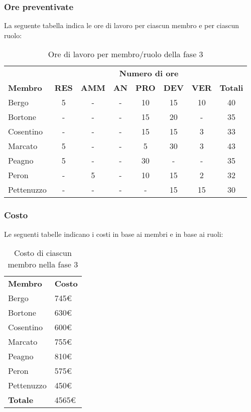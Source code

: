 	\subsubsection{Ore preventivate}
		La seguente tabella indica le ore di lavoro per ciascun membro e per ciascun ruolo:
		\begin{table}[h]
			\centering
			\begin{tabular}{| l | c c c c c c | c |}
				\rowcolor{LightBlue}
				& \multicolumn{7}{c}{\textbf{\color{white}Numero di ore}}	\\
	
				\rowcolor{LightBlue}
				\textbf{\color{white}Membro}
				& \textbf{\color{white}RES}
				& \textbf{\color{white}AMM}
				& \textbf{\color{white}AN}
				& \textbf{\color{white}PRO}
				& \textbf{\color{white}DEV}
				& \textbf{\color{white}VER}
				& \textbf{\color{white}Totali}\\
	
				Bergo      & 5 & - & - & 10 & 15 & 10 & 40 \\
				Bortone    & - & - & - & 15 & 20 & - & 35  \\
				Cosentino  & - & - & - & 15 & 15 & 3 & 33 \\
				Marcato    & 5 & - & - & 5 & 30 & 3 & 43 \\
				Peagno     & 5 & - & - & 30 & - & - & 35 \\
				Peron      & - & 5 & - & 10 & 15 & 2 & 32 \\
				Pettenuzzo & - & - & - & - & 15 & 15 & 30 \\ \hline
			\end{tabular}
			\caption{Ore di lavoro per membro/ruolo della fase 3}
		\end{table}
		
	\subsubsection{Costo}
		Le seguenti tabelle indicano i costi in base ai membri e in base ai ruoli:
		\begin{table}[h]
			\centering
			\begin{tabular}{| l | l |}
				\rowcolor{LightBlue}
				\textbf{\color{white}Membro}
				& \textbf{\color{white}Costo}\\
				
				Bergo 				& 745€\\
				Bortone 			& 630€\\
				Cosentino 		& 600€\\
				Marcato 			& 755€\\
				Peagno 			& 810€\\
				Peron 				& 575€\\
				Pettenuzzo 	& 450€\\ \hline
				\textbf{Totale} & 4565€\\ \hline
			\end{tabular}
			\caption{Costo di ciascun membro nella fase 3}
		\end{table}
		

